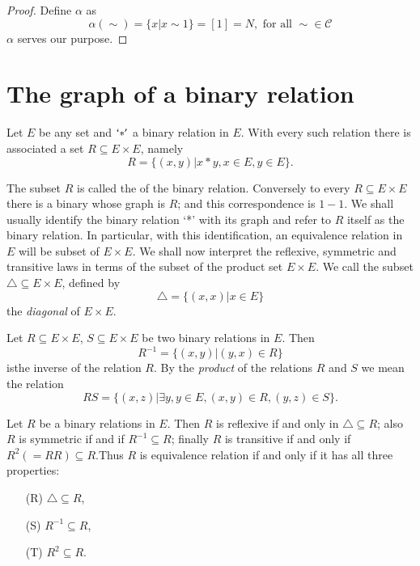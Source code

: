 \begin{proof}
  Define $\alpha$ as
  $$
  \alpha (\sim) = \bigg\{ x \big| x \sim 1\bigg\} = [1] =N, \text{ for
    all } \sim \in  \mathscr{C} 
  $$
  $\alpha$ serves our purpose.
\end{proof}

\section{The graph of a binary relation}\label{chap3:sec5}%

Let $E$ be any set and $`*'$ a binary relation in $E$. With every such
relation there is associated a set $R \subseteq E \times E$, namely 
$$
R = \bigg\{ (x,y) \big| x*y, x \in  E, y \in  E\bigg\}. 
$$

The subset $R$ is called the  of the binary
relation. Conversely to every $R \subseteq E \times E$ there is a
binary whose graph is $R$; and this correspondence is $1-1$. We shall
usually identify the binary relation `*' with its graph and refer to
$R$ itself as the binary relation. In particular, with this
identification, an equivalence relation in $E$ will be subset of $E
\times E$. We shall now interpret the reflexive, symmetric and
transitive laws in terms of the subset of the product set $E \times
E$. We call the subset $\triangle \subseteq E \times E$, defined by     
$$
\triangle = \bigg\{ (x,x)\big | x \in E\bigg\}
$$
the \textit{ diagonal } of $E \times E$.

Let $R \subseteq E \times E$, $S \subseteq E \times E$ be two binary
relations in $E$. Then 
$$
R^{-1} = \bigg\{ (x,y) \bigg| (y,x) \in  R\bigg\}
$$
is\pageoriginale the inverse of the relation $R$. By the \textit{product} of the
relations $R$ and $S$ we mean the relation 
$$
RS = \bigg\{ (x,z) \big| \exists y,y \in  E, (x,y) \in 
R, (y,z) \in  S\bigg\}. 
$$

Let $R$ be a binary relations in $E$. Then $R$ is reflexive if and
only in $\triangle \subseteq R$; also $R$ is symmetric if and if
$R^{-1} \subseteq R$; finally $R$ is transitive if and only if $R^2 (=
RR) \subseteq R$.Thus $R$ is equivalence relation if and only if it
has all three properties: 
\begin{enumerate}
\item [(R)] $\triangle \subseteq R$,
\item [(S)] $R^{-1} \subseteq R$,
\item [(T)] $R^2 \subseteq R$.
\end{enumerate}

